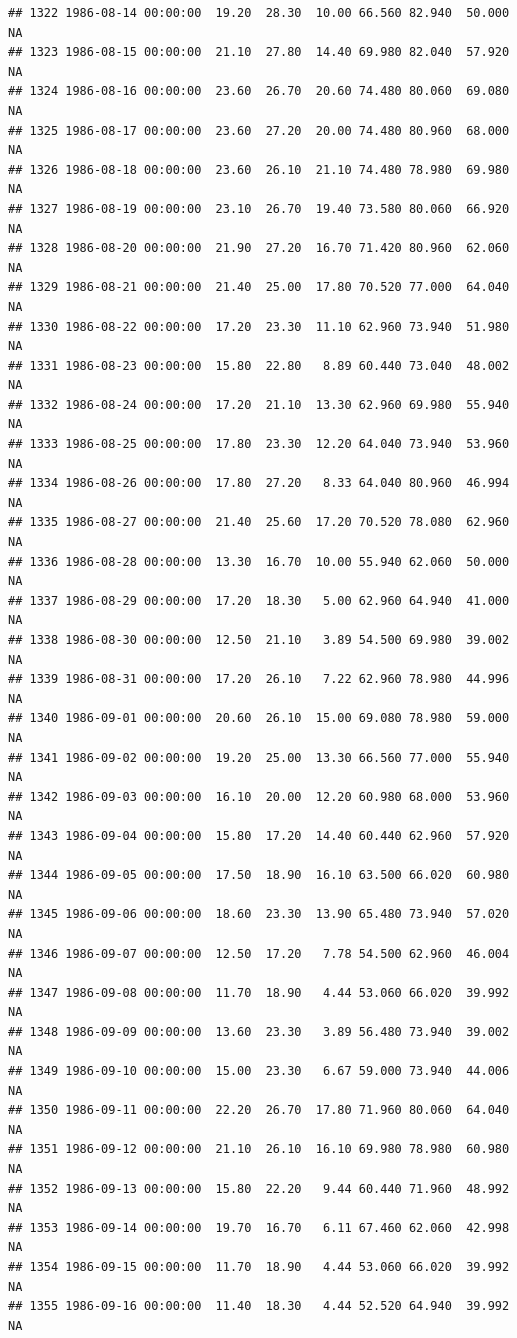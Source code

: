 \documentclass{article}\usepackage{graphicx, color}
\makeatletter
\newenvironment{kframe}{%
 \def\at@end@of@kframe{}%
 \ifinner\ifhmode%
  \def\at@end@of@kframe{\end{minipage}}%
  \begin{minipage}{\columnwidth}%
 \fi\fi%
 \def\FrameCommand##1{\hskip\@totalleftmargin \hskip-\fboxsep
 \colorbox{shadecolor}{##1}\hskip-\fboxsep
     \hskip-\linewidth \hskip-\@totalleftmargin \hskip\columnwidth}%
 \MakeFramed {\advance\hsize-\width
   \@totalleftmargin\z@ \linewidth\hsize
   \@setminipage}}%
 {\par\unskip\endMakeFramed%
 \at@end@of@kframe}
\newenvironment{knitrout}{}{} %
\makeatother
\begin{document}
\begin{knitrout}
\begin{kframe}
\begin{verbatim}
## 1322 1986-08-14 00:00:00  19.20  28.30  10.00 66.560 82.940  50.000     NA
## 1323 1986-08-15 00:00:00  21.10  27.80  14.40 69.980 82.040  57.920     NA
## 1324 1986-08-16 00:00:00  23.60  26.70  20.60 74.480 80.060  69.080     NA
## 1325 1986-08-17 00:00:00  23.60  27.20  20.00 74.480 80.960  68.000     NA
## 1326 1986-08-18 00:00:00  23.60  26.10  21.10 74.480 78.980  69.980     NA
## 1327 1986-08-19 00:00:00  23.10  26.70  19.40 73.580 80.060  66.920     NA
## 1328 1986-08-20 00:00:00  21.90  27.20  16.70 71.420 80.960  62.060     NA
## 1329 1986-08-21 00:00:00  21.40  25.00  17.80 70.520 77.000  64.040     NA
## 1330 1986-08-22 00:00:00  17.20  23.30  11.10 62.960 73.940  51.980     NA
## 1331 1986-08-23 00:00:00  15.80  22.80   8.89 60.440 73.040  48.002     NA
## 1332 1986-08-24 00:00:00  17.20  21.10  13.30 62.960 69.980  55.940     NA
## 1333 1986-08-25 00:00:00  17.80  23.30  12.20 64.040 73.940  53.960     NA
## 1334 1986-08-26 00:00:00  17.80  27.20   8.33 64.040 80.960  46.994     NA
## 1335 1986-08-27 00:00:00  21.40  25.60  17.20 70.520 78.080  62.960     NA
## 1336 1986-08-28 00:00:00  13.30  16.70  10.00 55.940 62.060  50.000     NA
## 1337 1986-08-29 00:00:00  17.20  18.30   5.00 62.960 64.940  41.000     NA
## 1338 1986-08-30 00:00:00  12.50  21.10   3.89 54.500 69.980  39.002     NA
## 1339 1986-08-31 00:00:00  17.20  26.10   7.22 62.960 78.980  44.996     NA
## 1340 1986-09-01 00:00:00  20.60  26.10  15.00 69.080 78.980  59.000     NA
## 1341 1986-09-02 00:00:00  19.20  25.00  13.30 66.560 77.000  55.940     NA
## 1342 1986-09-03 00:00:00  16.10  20.00  12.20 60.980 68.000  53.960     NA
## 1343 1986-09-04 00:00:00  15.80  17.20  14.40 60.440 62.960  57.920     NA
## 1344 1986-09-05 00:00:00  17.50  18.90  16.10 63.500 66.020  60.980     NA
## 1345 1986-09-06 00:00:00  18.60  23.30  13.90 65.480 73.940  57.020     NA
## 1346 1986-09-07 00:00:00  12.50  17.20   7.78 54.500 62.960  46.004     NA
## 1347 1986-09-08 00:00:00  11.70  18.90   4.44 53.060 66.020  39.992     NA
## 1348 1986-09-09 00:00:00  13.60  23.30   3.89 56.480 73.940  39.002     NA
## 1349 1986-09-10 00:00:00  15.00  23.30   6.67 59.000 73.940  44.006     NA
## 1350 1986-09-11 00:00:00  22.20  26.70  17.80 71.960 80.060  64.040     NA
## 1351 1986-09-12 00:00:00  21.10  26.10  16.10 69.980 78.980  60.980     NA
## 1352 1986-09-13 00:00:00  15.80  22.20   9.44 60.440 71.960  48.992     NA
## 1353 1986-09-14 00:00:00  19.70  16.70   6.11 67.460 62.060  42.998     NA
## 1354 1986-09-15 00:00:00  11.70  18.90   4.44 53.060 66.020  39.992     NA
## 1355 1986-09-16 00:00:00  11.40  18.30   4.44 52.520 64.940  39.992     NA

\end{verbatim}
\end{kframe}
\end{knitrout}
\end{document}

